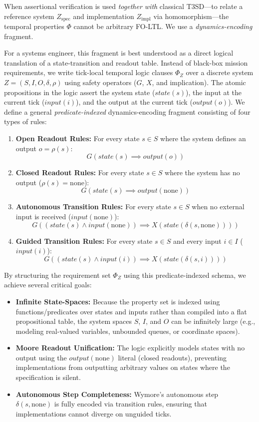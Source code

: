 When assertional verification is used \emph{together with} classical T3SD---to relate a reference system $Z_{\text{spec}}$ and implementation $Z_{\text{impl}}$ via homomorphism---the temporal properties $\Phi$ cannot be arbitrary FO-LTL. We use a \emph{dynamics-encoding} fragment. 

For a systems engineer, this fragment is best understood as a direct logical translation of a state-transition and readout table. Instead of black-box mission requirements, we write tick-local temporal logic clauses $\Phi_Z$ over a discrete system $Z = (S, I, O, \delta, \rho)$ using safety operators ($G$, $X$, and implication). The atomic propositions in the logic assert the system state ($state(s)$), the input at the current tick ($input(i)$), and the output at the current tick ($output(o)$). We define a general \emph{predicate-indexed} dynamics-encoding fragment consisting of four types of rules:
\begin{enumerate}
    \item \textbf{Open Readout Rules:} For every state $s \in S$ where the system defines an output $o = \rho(s)$:
    \[ G(state(s) \implies output(o)) \]
    \item \textbf{Closed Readout Rules:} For every state $s \in S$ where the system has no output ($\rho(s) = \text{none}$):
    \[ G(state(s) \implies output(\text{none})) \]
    \item \textbf{Autonomous Transition Rules:} For every state $s \in S$ when no external input is received ($input(\text{none})$):
    \[ G((state(s) \wedge input(\text{none})) \implies X(state(\delta(s, \text{none})))) \]
    \item \textbf{Guided Transition Rules:} For every state $s \in S$ and every input $i \in I$ ($input(i)$):
    \[ G((state(s) \wedge input(i)) \implies X(state(\delta(s, i)))) \]
\end{enumerate}

By structuring the requirement set $\Phi_Z$ using this predicate-indexed schema, we achieve several critical goals:
\begin{itemize}
    \item \textbf{Infinite State-Spaces:} Because the property set is indexed using functions/predicates over states and inputs rather than compiled into a flat propositional table, the system spaces $S$, $I$, and $O$ can be infinitely large (e.g., modeling real-valued variables, unbounded queues, or coordinate spaces).
    \item \textbf{Moore Readout Unification:} The logic explicitly models states with no output using the $output(\text{none})$ literal (closed readouts), preventing implementations from outputting arbitrary values on states where the specification is silent.
    \item \textbf{Autonomous Step Completeness:} Wymore's autonomous step $\delta(s, \text{none})$ is fully encoded via transition rules, ensuring that implementations cannot diverge on unguided ticks.
\end{itemize}

